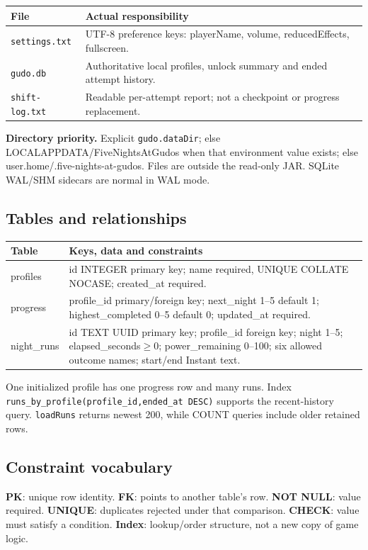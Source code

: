 \documentclass[11pt,a4paper]{article}
\newcommand{\code}[1]{\nolinkurl{#1}}
\begin{document}
\par\noindent\begin{tabularx}{\linewidth}{L{.23\linewidth}X}\toprule\textbf{File}&\textbf{Actual responsibility}\\\midrule
\code{settings.txt}&UTF-8 preference keys: playerName, volume, reducedEffects, fullscreen.\\
\code{gudo.db}&Authoritative local profiles, unlock summary and ended attempt history.\\
\code{shift-log.txt}&Readable per-attempt report; not a checkpoint or progress replacement.\\\bottomrule\end{tabularx}\par
\textbf{Directory priority.} Explicit \code{gudo.dataDir}; else LOCALAPPDATA/FiveNightsAtGudos when that environment value exists; else user.home/.five-nights-at-gudos. Files are outside the read-only JAR. SQLite WAL/SHM sidecars are normal in WAL mode.
\subsection*{Tables and relationships}
\par\noindent\begin{tabularx}{\linewidth}{L{.19\linewidth}X}\toprule
\textbf{Table}&\textbf{Keys, data and constraints}\\\midrule
profiles&id INTEGER primary key; name required, UNIQUE COLLATE NOCASE; created\_at required.\\
progress&profile\_id primary/foreign key; next\_night 1--5 default 1; highest\_completed 0--5 default 0; updated\_at required.\\
night\_runs&id TEXT UUID primary key; profile\_id foreign key; night 1--5; elapsed\_seconds$\geq0$; power\_remaining 0--100; six allowed outcome names; start/end Instant text.\\\bottomrule\end{tabularx}\par
One initialized profile has one progress row and many runs. Index \code{runs_by_profile(profile_id,ended_at DESC)} supports the recent-history query. \code{loadRuns} returns newest 200, while COUNT queries include older retained rows.
\subsection*{Constraint vocabulary}
\textbf{PK}: unique row identity. \textbf{FK}: points to another table's row. \textbf{NOT NULL}: value required. \textbf{UNIQUE}: duplicates rejected under that comparison. \textbf{CHECK}: value must satisfy a condition. \textbf{Index}: lookup/order structure, not a new copy of game logic.
\end{document}
